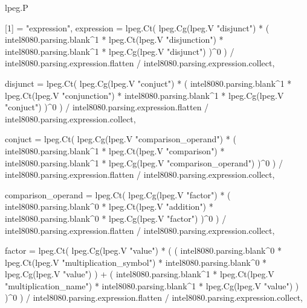     lpeg.P {
        [1] = "expression",
        expression = lpeg.Ct(
            lpeg.Cg(lpeg.V "disjunct")
            * (
                intel8080.parsing.blank^1
                * lpeg.Ct(lpeg.V "disjunction")
                * intel8080.parsing.blank^1
                * lpeg.Cg(lpeg.V "disjunct")
            )^0
        ) / intel8080.parsing.expression.flatten / intel8080.parsing.expression.collect,

        disjunct = lpeg.Ct(
            lpeg.Cg(lpeg.V "conjuct")
            * (
                intel8080.parsing.blank^1
                * lpeg.Ct(lpeg.V "conjunction")
                * intel8080.parsing.blank^1
                * lpeg.Cg(lpeg.V "conjuct")
            )^0
        ) / intel8080.parsing.expression.flatten / intel8080.parsing.expression.collect,

        conjuct = lpeg.Ct(
            lpeg.Cg(lpeg.V "comparison_operand")
            * (
                intel8080.parsing.blank^1
                * lpeg.Ct(lpeg.V "comparison")
                * intel8080.parsing.blank^1
                * lpeg.Cg(lpeg.V "comparison_operand")
            )^0
        ) / intel8080.parsing.expression.flatten / intel8080.parsing.expression.collect,

        comparison_operand = lpeg.Ct(
            lpeg.Cg(lpeg.V "factor")
            * (
                intel8080.parsing.blank^0
                * lpeg.Ct(lpeg.V "addition")
                * intel8080.parsing.blank^0
                * lpeg.Cg(lpeg.V "factor")
            )^0
        ) / intel8080.parsing.expression.flatten / intel8080.parsing.expression.collect,

        factor = lpeg.Ct(
            lpeg.Cg(lpeg.V "value")
            * (
                (
                    intel8080.parsing.blank^0
                    * lpeg.Ct(lpeg.V "multiplication_symbol")
                    * intel8080.parsing.blank^0
                    * lpeg.Cg(lpeg.V "value")
                )
                +
                (
                    intel8080.parsing.blank^1
                    * lpeg.Ct(lpeg.V "multiplication_name")
                    * intel8080.parsing.blank^1
                    * lpeg.Cg(lpeg.V "value")
                )
            )^0
        ) / intel8080.parsing.expression.flatten / intel8080.parsing.expression.collect,

}
